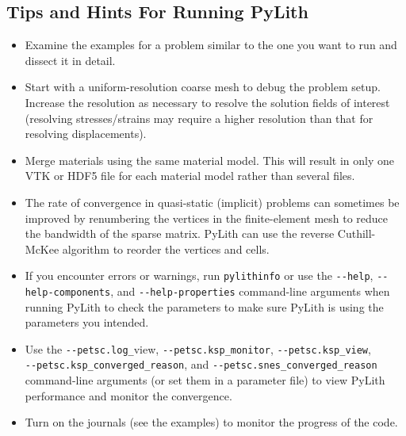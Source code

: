 \subsection{Tips and Hints For Running PyLith}
\begin{itemize}
\item Examine the examples for a problem similar to the one you want to
run and dissect it in detail.
\item Start with a uniform-resolution coarse mesh to debug the problem setup.
Increase the resolution as necessary to resolve the solution fields
of interest (resolving stresses/strains may require a higher resolution
than that for resolving displacements).
\item Merge materials using the same material model. This will result in
only one VTK or HDF5 file for each material model rather than several
files.
\item The rate of convergence in quasi-static (implicit) problems can sometimes
be improved by renumbering the vertices in the finite-element mesh
to reduce the bandwidth of the sparse matrix. PyLith can use the reverse
Cuthill-McKee algorithm to reorder the vertices and cells.
\item If you encounter errors or warnings, run \texttt{pylithinfo} or use
the \texttt{-{}-help}, \texttt{-{}-help-components}, and \texttt{-{}-help-properties}
command-line arguments when running PyLith to check the parameters
to make sure PyLith is using the parameters you intended.
\item Use the \texttt{-{}-petsc.log\_}view, \texttt{-{}-petsc.ksp\_monitor},
\texttt{-{}-petsc.ksp\_view}, \texttt{} \\
\texttt{-{}-petsc.ksp\_converged\_reason}, and \texttt{-{}-petsc.snes\_converged\_reason}
command-line arguments (or set them in a parameter file) to view PyLith
performance and monitor the convergence.
\item Turn on the journals (see the examples) to monitor the progress of
the code.
\end{itemize}

